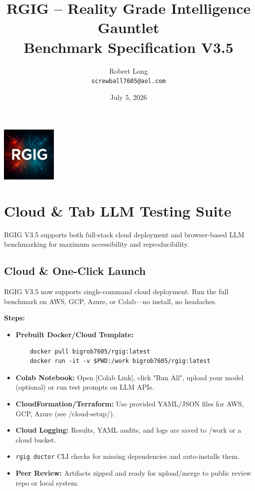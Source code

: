 \documentclass[11pt]{article}
\title{RGIG -- Reality Grade Intelligence Gauntlet\\Benchmark Specification V3.5}
\author{Robert Long \\ \texttt{screwball7605@aol.com}}
\date{July 5, 2026}
\begin{document}
\maketitle

\begin{center}
  \includegraphics[width=0.2\textwidth]{RGIG.png}
\end{center}

\section*{Cloud \& Tab LLM Testing Suite}
RGIG V3.5 supports both full-stack cloud deployment and browser-based LLM benchmarking for maximum accessibility and reproducibility.

\subsection*{Cloud \& One-Click Launch}
RGIG V3.5 now supports single-command cloud deployment. Run the full benchmark on AWS, GCP, Azure, or Colab—no install, no headaches.

\textbf{Steps:}
\begin{itemize}
  \item \textbf{Prebuilt Docker/Cloud Template:}
    \begin{verbatim}
    docker pull bigrob7605/rgig:latest
    docker run -it -v $PWD:/work bigrob7605/rgig:latest
    \end{verbatim}
  \item \textbf{Colab Notebook:} Open [Colab Link], click "Run All", upload your model (optional) or run test prompts on LLM APIs.
  \item \textbf{CloudFormation/Terraform:} Use provided YAML/JSON files for AWS, GCP, Azure (see /cloud-setup/).
  \item \textbf{Cloud Logging:} Results, YAML audits, and logs are saved to /work or a cloud bucket.
  \item \texttt{rgig doctor} CLI checks for missing dependencies and auto-installs them.
  \item \textbf{Peer Review:} Artifacts zipped and ready for upload/merge to public review repo or local system.
\end{itemize}
\end{document}
